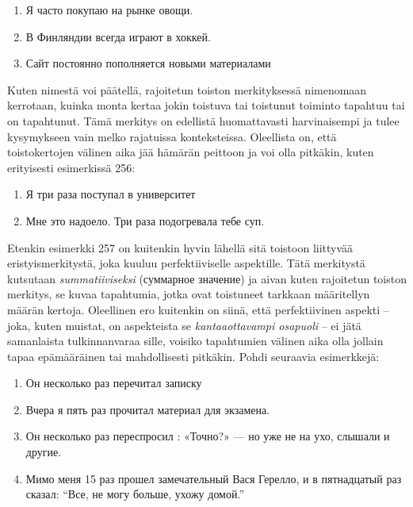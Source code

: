 \documentclass[]{scrreprt}
\providecommand{\tightlist}{%
  \setlength{\itemsep}{0pt}\setlength{\parskip}{0pt}}
\begin{document}
\begin{enumerate}
\def\labelenumi{(\arabic{enumi})}
\setcounter{enumi}{252}
\tightlist
\item
  Я часто покупаю на рынке овощи.
\item
  В Финляндии всегда играют в хоккей.
\item
  Сайт постоянно пополняется новыми материалами
\end{enumerate}

Kuten nimestä voi päätellä, rajoitetun toiston merkityksessä nimenomaan
kerrotaan, kuinka monta kertaa jokin toistuva tai toistunut toiminto
tapahtuu tai on tapahtunut. Tämä merkitys on edellistä huomattavasti
harvinaisempi ja tulee kysymykseen vain melko rajatuissa konteksteissa.
Oleellista on, että toistokertojen välinen aika jää hämärän peittoon ja
voi olla pitkäkin, kuten erityisesti esimerkissä 256:

\begin{enumerate}
\def\labelenumi{(\arabic{enumi})}
\setcounter{enumi}{255}
\tightlist
\item
  Я три раза поступал в университет
\item
  Мне это надоело. Три раза подогревала тебе суп.
\end{enumerate}

Etenkin esimerkki 257 on kuitenkin hyvin lähellä sitä toistoon liittyvää
eristyismerkitystä, joka kuuluu perfektiiviselle aspektille. Tätä
merkitystä kutsutaan \emph{summatiiviseksi} (суммарное значение) ja
aivan kuten rajoitetun toiston merkitys, se kuvaa tapahtumia, jotka ovat
toistuneet tarkkaan määritellyn määrän kertoja. Oleellinen ero kuitenkin
on siinä, että perfektiivinen aspekti -- joka, kuten muistat, on
aspekteista se \emph{kantaaottavampi osapuoli} -- ei jätä samanlaista
tulkinnanvaraa sille, voisiko tapahtumien välinen aika olla jollain
tapaa epämääräinen tai mahdollisesti pitkäkin. Pohdi seuraavia
esimerkkejä:

\begin{enumerate}
\def\labelenumi{(\arabic{enumi})}
\setcounter{enumi}{257}
\tightlist
\item
  Он несколько раз перечитал записку
\item
  Вчера я пять раз прочитал материал для экзамена.
\item
  Он несколько раз переспросил : «Точно?» --- но уже не на ухо, слышали
  и другие.
\item
  Мимо меня 15 раз прошел замечательный Вася Герелло, и в пятнадцатый
  раз сказал: ``Все, не могу больше, ухожу домой.''
\end{enumerate}
\end{document}
